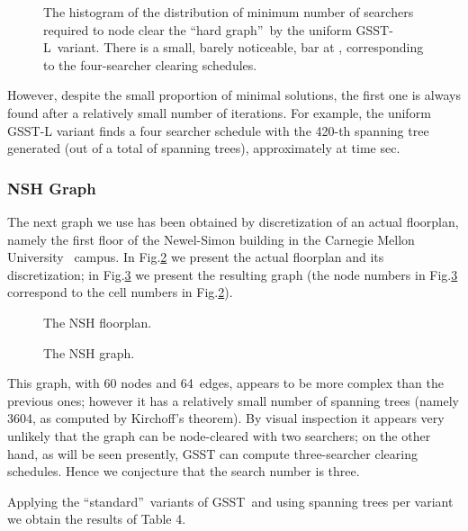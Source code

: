 \documentclass[11pt]{article}\usepackage{amsmath}
\begin{document}
\begin{figure}[h]
\centering{}\caption{The
histogram of the distribution of minimum number of searchers required to node
clear the \textquotedblleft hard graph\textquotedblright\ by the uniform
GSST-L\ variant. There is a small, barely noticeable, bar at ,
corresponding to the four-searcher clearing schedules.}\label{fig06}\end{figure}

However, despite the small proportion of minimal solutions, the first one is
always found after a relatively small number of iterations. For example, the
uniform GSST-L variant finds a four searcher schedule with the 420-th spanning
tree generated (out of a total of  spanning trees),
approximately at time sec.

\subsubsection{NSH Graph}

The next graph we use has been obtained by discretization of an actual
floorplan, namely the first floor of the Newel-Simon building in the Carnegie
Mellon University \ campus. In Fig.\ref{fig08} we present the actual floorplan
and its discretization; in Fig.\ref{fig09} we present the resulting graph (the
node numbers in Fig.\ref{fig09} correspond to the cell numbers in
Fig.\ref{fig08}).

\begin{figure}[h]
\centering
{}\caption{The NSH floorplan.}\label{fig08}\end{figure}

\begin{figure}[h]
\centering
{}\caption{The NSH graph.}\label{fig09}\end{figure}

\clearpage


This graph, with 60 nodes and 64\ edges, appears to be more complex than the
previous ones; however it has a relatively small number of spanning trees
(namely 3604, as computed by Kirchoff's theorem). By visual inspection it
appears very unlikely that the graph can be node-cleared with two searchers;
on the other hand, as will be seen presently, GSST can compute three-searcher
clearing schedules. Hence we conjecture that the search number 
is three.

Applying the \textquotedblleft standard\textquotedblright\ variants of
GSST\ and using  spanning trees per variant we obtain the
results of Table 4.
\end{document}

